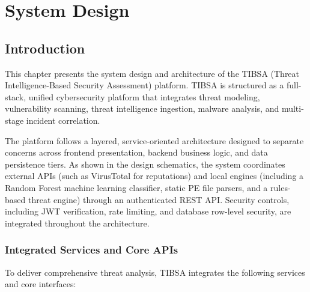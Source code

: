 \chapter{System Design}
\label{ch:chapter4}

\section{Introduction}
\label{sec:ch4_intro}

This chapter presents the system design and architecture of the TIBSA (Threat Intelligence-Based Security Assessment) platform. TIBSA is structured as a full-stack, unified cybersecurity platform that integrates threat modeling, vulnerability scanning, threat intelligence ingestion, malware analysis, and multi-stage incident correlation.

The platform follows a layered, service-oriented architecture designed to separate concerns across frontend presentation, backend business logic, and data persistence tiers. As shown in the design schematics, the system coordinates external APIs (such as VirusTotal for reputations) and local engines (including a Random Forest machine learning classifier, static PE file parsers, and a rules-based threat engine) through an authenticated REST API. Security controls, including JWT verification, rate limiting, and database row-level security, are integrated throughout the architecture.

\subsection{Integrated Services and Core APIs}

To deliver comprehensive threat analysis, TIBSA integrates the following services and core interfaces:

